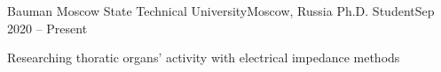 
    \resumeSubheading
    {Bauman Moscow State Technical University}{Moscow, Russia}
    {Ph.D. Student}{Sep 2020 -- Present}
    \begin{itemize}[leftmargin=0in, label={}]
        \small{\item{
            {Researching thoratic organs' activity with electrical impedance methods}\\
        }}
        \end{itemize}